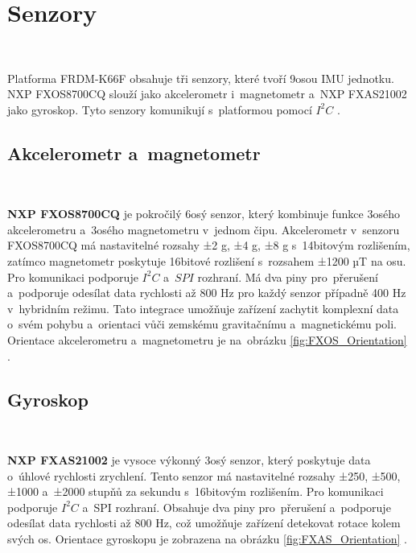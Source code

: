 \chapter{Senzory}
\label{sec:Sensors}\

Platforma FRDM-K66F obsahuje tři senzory, které tvoří 9osou IMU jednotku.
NXP FXOS8700CQ slouží jako akcelerometr i~magnetometr a~NXP FXAS21002 jako gyroskop.
Tyto senzory komunikují s~platformou pomocí $I^2C$ \cite{frdmk66UserGuide}.

\section{Akcelerometr a~magnetometr}\

\textbf{NXP FXOS8700CQ} je pokročilý 6osý senzor, který kombinuje funkce 3osého
akcelerometru a~3osého magnetometru v~jednom čipu. Akcelerometr v~senzoru
FXOS8700CQ má nastavitelné rozsahy ±2 g, ±4 g, ±8 g s~14bitovým rozlišením, 
zatímco magnetometr poskytuje 16bitové rozlišení s~rozsahem ±1200 µT na osu. 
Pro komunikaci podporuje $I^2C$ a~$SPI$ rozhraní. Má dva piny pro~přerušení 
a~podporuje odesílat data rychlosti až 800 Hz pro každý senzor případně 400 Hz 
v~hybridním režimu. Tato integrace umožňuje zařízení zachytit komplexní 
data o~svém pohybu a~orientaci vůči zemskému gravitačnímu a~magnetickému poli. 
Orientace akcelerometru a~magnetometru je na~obrázku \ref{fig:FXOS_Orientation} 
\cite{FXOS8700CQ}.

\section{Gyroskop}\

\textbf{NXP FXAS21002} je vysoce výkonný 3osý senzor, který poskytuje 
data o~úhlové rychlosti zrychlení. Tento senzor má nastavitelné rozsahy 
±250, ±500, ±1000 a~±2000 stupňů za sekundu s~16bitovým rozlišením. 
Pro komunikaci podporuje $I^2C$ a~SPI rozhraní. Obsahuje dva piny pro~přerušení 
a~podporuje odesílat data rychlosti až 800 Hz, což umožňuje zařízení detekovat 
rotace kolem svých os. Orientace gyroskopu je zobrazena na obrázku 
\ref{fig:FXAS_Orientation} \cite{FXAS21002}.

